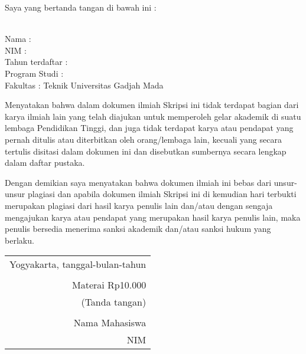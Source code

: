 \noindent Saya yang bertanda tangan di bawah ini :

\vspace{-1em}

\begin{tabbing}
\hspace{40mm} \= \\ %
\noindent Nama \> : \\[\parskip]
\noindent NIM \> :  \\[\parskip]
\noindent Tahun terdaftar \> :  \\[\parskip]
\noindent Program Studi \> :  \\[\parskip]
\noindent Fakultas \> : Teknik Universitas Gadjah Mada
\end{tabbing}

\noindent Menyatakan bahwa dalam dokumen ilmiah Skripsi ini tidak terdapat bagian dari karya ilmiah lain yang telah diajukan untuk memperoleh gelar akademik di suatu lembaga Pendidikan Tinggi, dan juga tidak terdapat karya atau pendapat yang pernah ditulis atau diterbitkan oleh orang/lembaga lain, kecuali yang secara tertulis disitasi dalam dokumen ini dan disebutkan sumbernya secara lengkap dalam daftar pustaka.

\noindent Dengan demikian saya menyatakan bahwa dokumen ilmiah ini bebas dari unsur-unsur plagiasi dan apabila dokumen ilmiah Skripsi ini di kemudian hari terbukti merupakan plagiasi dari hasil karya penulis lain dan/atau dengan sengaja mengajukan karya atau pendapat yang merupakan hasil karya penulis lain, maka penulis bersedia menerima sanksi akademik dan/atau sanksi hukum yang berlaku.


\begin{flushright}
	\begin{tabular}{r}
		Yogyakarta, tanggal-bulan-tahun \\
		\vspace{0.1cm} \\
		\tiny{Materai Rp10.000} \\
		\tiny{(Tanda tangan)} \\	
		\vspace{0.1cm} \\
		Nama Mahasiswa \\ NIM
	\end{tabular}
\end{flushright}